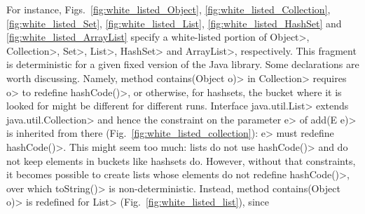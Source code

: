 For instance, Figs.~\ref{fig:white_listed_Object}, \ref{fig:white_listed_Collection},
\ref{fig:white_listed_Set}, \ref{fig:white_listed_List},
\ref{fig:white_listed_HashSet} and \ref{fig:white_listed_ArrayList}
specify a white-listed portion of \<Object>,
\<Collection>, \<Set>, \<List>, \<HashSet> and \<ArrayList>, respectively.
This fragment is deterministic for a given fixed version of the Java library.
Some declarations are worth discussing. Namely, method
\<contains(Object o)> in \<Collection> requires \<o> to redefine \<hashCode()>,
or otherwise, for hashsets, the bucket where it is looked for might be different
for different runs. Interface \<java.util.List> extends \<java.util.Collection> and hence
the constraint on the parameter \<e> of \<add(E e)> is inherited from there
(Fig.~\ref{fig:white_listed_collection}): \<e> must redefine \<hashCode()>.
This might seem too much: lists do not use \<hashCode()> and do not keep elements in buckets
like hashsets do. However, without that constraints,
it becomes possible to create lists whose elements do not redefine \<hashCode()>, over which
\<toString()> is non-deterministic. Instead, method \<contains(Object o)> is redefined
for \<List> (Fig.~\ref{fig:white_listed_list}), since

